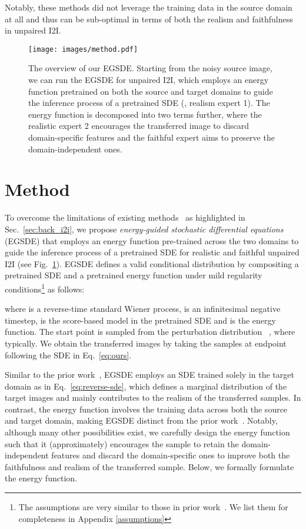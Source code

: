 \documentclass{article}
\begin{document}
Notably, these methods did not leverage the training data in the source domain at all and thus can be sub-optimal in terms of both the realism and faithfulness in unpaired I2I.

\begin{figure}
  \centering
  \texttt{[image: images/method.pdf]}
  \caption{
  The overview of our EGSDE. Starting from the noisy source image, we can run the EGSDE for unpaired I2I, which employs an energy function  pretrained on both the source and target domains to guide the inference process of a pretrained SDE (, realism expert 1). The energy function is decomposed into two terms further, where the realistic expert 2  encourages the transferred image to discard domain-specific features and the faithful expert  aims to preserve the domain-independent ones.}
  \label{fig:method}
  \vspace{-0.5cm}
\end{figure}

\section{Method}
\label{method}
To overcome the limitations of existing methods~\cite{choi2021ilvr,meng2021sdedit} as highlighted in Sec.~\ref{sec:back_i2i}, we propose \emph{energy-guided stochastic differential equations} (EGSDE)
that employs an energy function pre-trained across the two domains to guide the inference process of a pretrained SDE for realistic and faithful unpaired I2I (see Fig.~\ref{fig:method}).
EGSDE defines a valid conditional distribution  by compositing a pretrained SDE  and a pretrained energy function under mild regularity conditions\footnote{The assumptions are very similar to those in prior work~\cite{song2020score}. We list them for completeness in Appendix \ref{assumptions}} as follows:

where  is a reverse-time standard Wiener process,  is an infinitesimal negative timestep,  is the score-based model in the pretrained SDE and  is the energy function. The start point  is sampled from the perturbation distribution ~\cite{meng2021sdedit}, where  typically. We obtain the transferred images by taking the samples at endpoint  following the SDE in Eq.~\eqref{eq:ours}.


Similar to the prior work~\cite{choi2021ilvr,meng2021sdedit}, EGSDE employs an SDE trained solely in the target domain as in Eq.~\eqref{eq:reverse-sde}, which defines a marginal distribution of the target images and mainly contributes to the realism of the transferred samples. In contrast, the energy function involves the training data across both the source and target domain, making EGSDE distinct from the prior work~\cite{choi2021ilvr,meng2021sdedit}. Notably, although many other possibilities exist, we carefully design the energy function
such that it (approximately) encourages the sample to retain the domain-independent features and discard the domain-specific ones to improve both the faithfulness and realism of the transferred sample. 
Below, we formally formulate the energy function.
\end{document}
